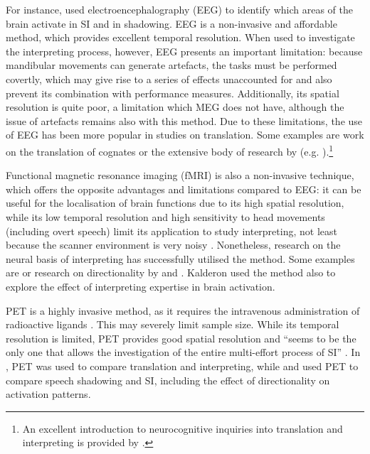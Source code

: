 For instance, \citet{petsche_brain_1993} used electroencephalography (EEG) to identify which areas of the brain activate in SI and in shadowing. EEG is a non-invasive and affordable method, which provides excellent temporal resolution. When used to investigate the interpreting process, however, EEG presents an important limitation: because mandibular movements can generate artefacts, the tasks must be performed covertly, which may give rise to a series of effects unaccounted for and also prevent its combination with performance measures. Additionally, its spatial resolution is quite poor, a limitation which MEG does not have, although the issue of artefacts remains also with this method. Due to these limitations, the use of EEG has been more popular in studies on translation. Some examples are  work on the translation of cognates or the extensive body of research by \citeauthor{garcia2013brain} (e.g. \citeyear{garcia2013brain,garcia_translating_2015,garcia_neurocognition_2019}).\footnote{An excellent introduction to neurocognitive inquiries into translation and interpreting is provided by \citet{garcia_neurocognition_2019}.}

Functional magnetic resonance imaging (fMRI) is also a non-invasive technique, which offers the opposite advantages and limitations compared to EEG: it can be useful for the localisation of brain functions due to its high spatial resolution, while its low temporal resolution and high sensitivity to head movements (including overt speech) limit its application to study interpreting, not least because the scanner environment is very noisy \citep{tommola_images_2000}. Nonetheless, research on the neural basis of interpreting has successfully utilised the method. Some examples are \citet{hervais-adelman_executive_2011,hervais-adelman_fmri_2015} or research on directionality by \citet{chang_testing_2009} and \citet{kalderon_neurophysiologie_2017}. Kalderon used the method also to explore the effect of interpreting expertise in brain activation.

PET is a highly invasive method, as it requires the intravenous administration of radioactive ligands \citep[25]{seeber_cognitive_2013}. This may severely limit sample size. While its temporal resolution is limited, PET provides good spatial resolution and ``seems to be the only one that allows the investigation of the entire multi-effort process of SI'' \citep[18]{tommola_images_2000}. In \citet{price_functional_1999}, PET was used to compare translation and interpreting, while \citet{rinne_translating_2000} and \citet{tommola_images_2000} used PET to compare speech shadowing and SI, including the effect of directionality on activation patterns.


